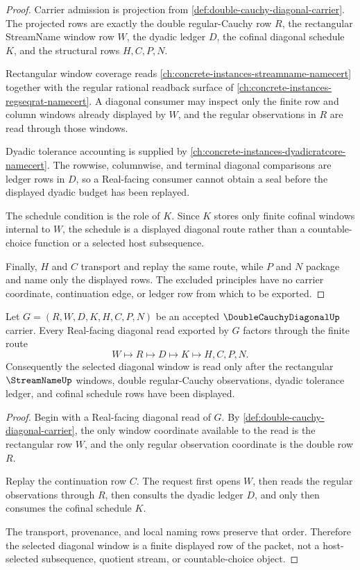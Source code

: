 \begin{proof}
Carrier admission is projection from \autoref{def:double-cauchy-diagonal-carrier}. The projected rows are exactly the double regular-Cauchy row $R$, the rectangular StreamName window row $W$, the dyadic ledger $D$, the cofinal diagonal schedule $K$, and the structural rows $H,C,P,N$.

Rectangular window coverage reads \autoref{ch:concrete-instances-streamname-namecert} together with the regular rational readback surface of \autoref{ch:concrete-instances-regseqrat-namecert}. A diagonal consumer may inspect only the finite row and column windows already displayed by $W$, and the regular observations in $R$ are read through those windows.

Dyadic tolerance accounting is supplied by \autoref{ch:concrete-instances-dyadicratcore-namecert}. The rowwise, columnwise, and terminal diagonal comparisons are ledger rows in $D$, so a Real-facing consumer cannot obtain a seal before the displayed dyadic budget has been replayed.

The schedule condition is the role of $K$. Since $K$ stores only finite cofinal windows internal to $W$, the schedule is a displayed diagonal route rather than a countable-choice function or a selected host subsequence.

Finally, $H$ and $C$ transport and replay the same route, while $P$ and $N$ package and name only the displayed rows. The excluded principles have no carrier coordinate, continuation edge, or ledger row from which to be exported.
\end{proof}

\begin{theorem}
\label{thm:double-cauchy-diagonal-cofinal-window-selection}
Let $G=(R,W,D,K,H,C,P,N)$ be an accepted $\DoubleCauchyDiagonalUp$ carrier. Every Real-facing diagonal read exported by $G$ factors through the finite route
$$
W \longmapsto R \longmapsto D \longmapsto K \longmapsto H,C,P,N .
$$
Consequently the selected diagonal window is read only after the rectangular $\StreamNameUp$ windows, double regular-Cauchy observations, dyadic tolerance ledger, and cofinal schedule rows have been displayed.
\end{theorem}
\begin{proof}
Begin with a Real-facing diagonal read of $G$. By \autoref{def:double-cauchy-diagonal-carrier}, the only window coordinate available to the read is the rectangular row $W$, and the only regular observation coordinate is the double row $R$.

Replay the continuation row $C$. The request first opens $W$, then reads the regular observations through $R$, then consults the dyadic ledger $D$, and only then consumes the cofinal schedule $K$.

The transport, provenance, and local naming rows preserve that order. Therefore the selected diagonal window is a finite displayed row of the packet, not a host-selected subsequence, quotient stream, or countable-choice object.
\end{proof}

